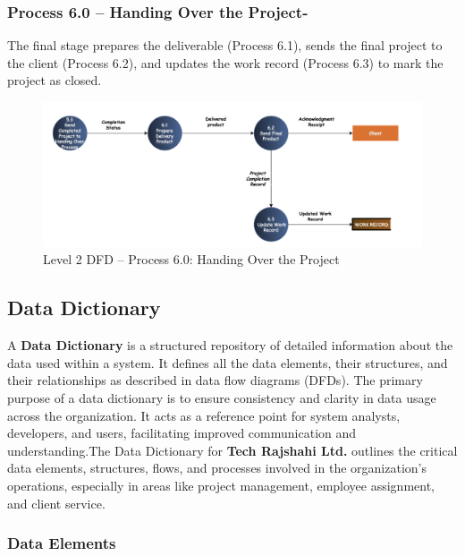 \documentclass[12pt,a4paper]{article}
\begin{document}
\newpage
\subsubsection*{Process 6.0 – Handing Over the Project-}
\noindent
The final stage prepares the deliverable (Process 6.1), sends the final project to the client (Process 6.2), and updates the work record (Process 6.3) to mark the project as closed.

\begin{figure}[H]
    \centering
    \includegraphics[width=\textwidth]{Fig/process6_dfd.png}
    \caption{Level 2 DFD – Process 6.0: Handing Over the Project}
    \label{fig:level2_process6}
\end{figure}

\vspace{2cm}
\subsection{Data Dictionary}

A \textbf{Data Dictionary} is a structured repository of detailed information about the data used within a system. It defines all the data elements, their structures, and their relationships as described in data flow diagrams (DFDs). The primary purpose of a data dictionary is to ensure consistency and clarity in data usage across the organization. It acts as a reference point for system analysts, developers, and users, facilitating improved communication and understanding.The Data Dictionary for \textbf{Tech Rajshahi Ltd.} outlines the critical data elements, structures, flows, and processes involved in the organization’s operations, especially in areas like project management, employee assignment, and client service.


\subsubsection{Data Elements}
\end{document}
